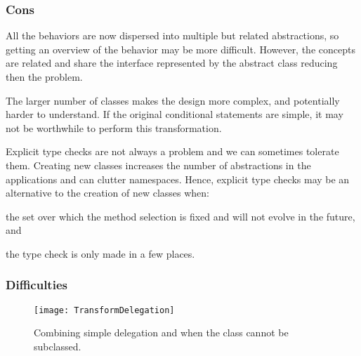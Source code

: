 \documentclass[a4paper,10pt,twoside]{book}
\begin{document}
\subsubsection*{Cons}

\begin{bulletlist}
\item All the behaviors are now dispersed into multiple but related abstractions, so getting an overview of the behavior may be more difficult. However, the concepts are related and share the interface represented by the abstract class reducing then the problem. 

\item The larger number of classes makes the design more complex, and potentially harder to understand. If the original conditional statements are simple, it may not be worthwhile to perform this transformation.

\item Explicit type checks are not always a problem and we can sometimes tolerate them. Creating new classes increases the number of abstractions in the applications and can clutter namespaces. Hence, explicit type checks may be an alternative to the creation of new classes when: 
	\begin{bulletlist}
	\item the set over which the method selection is fixed and will not evolve in the future, and 
	\item the type check is only made in a few places.
	\end{bulletlist}
\end{bulletlist}

\subsubsection*{Difficulties}

\begin{figure}[tb]
\begin{center}
\texttt{[image: TransformDelegation]}
\caption{Combining simple delegation and  when the class cannot be subclassed.}
\end{center}
\end{figure}
\end{document}
